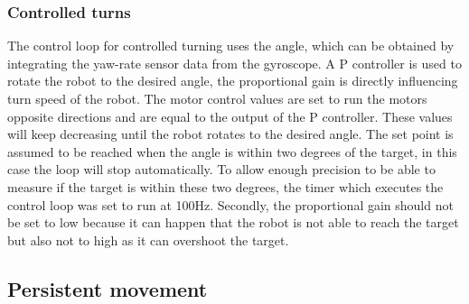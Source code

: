\subsubsection{Controlled turns}

The control loop for controlled turning uses the angle, which can be obtained by integrating the yaw-rate sensor data from the gyroscope.
A P controller is used to rotate the robot to the desired angle, the proportional gain is directly influencing turn speed of the robot.
The motor control values are set to run the motors opposite directions and are equal to the output of the P controller.
These values will keep decreasing until the robot rotates to the desired angle.
The set point is assumed to be reached when the angle is within two degrees of the target, in this case the loop will stop automatically.
To allow enough precision to be able to measure if the target is within these two degrees, the timer which executes the control loop was set to run at 100Hz.
Secondly, the proportional gain should not be set to low because it can happen that the robot is not able to reach the target but also not to high as it can overshoot the target.

\subsection{Persistent movement}


